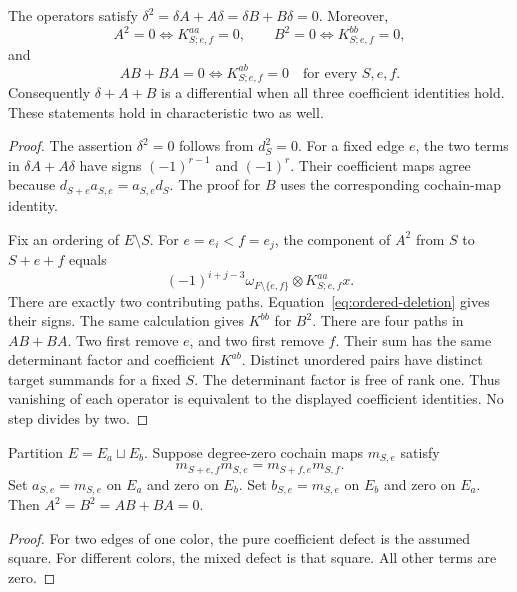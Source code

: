 \begin{theorem}
\label{thm:exact-coefficient-criterion}
The operators satisfy $\delta^2=\delta A+A\delta=\delta B+B\delta=0$.
Moreover,
\[
A^2=0\iff K^{aa}_{S;e,f}=0,\qquad
B^2=0\iff K^{bb}_{S;e,f}=0,
\]
and
\begin{equation}
\label{eq:exact-mixed-criterion}
AB+BA=0\iff K^{ab}_{S;e,f}=0
\quad\text{for every }S,e,f.
\end{equation}
Consequently $\delta+A+B$ is a differential when all three coefficient identities hold.
These statements hold in characteristic two as well.
\end{theorem}

\begin{proof}
The assertion $\delta^2=0$ follows from $d_S^2=0$.
For a fixed edge $e$, the two terms in $\delta A+A\delta$ have signs
$(-1)^{r-1}$ and $(-1)^r$.
Their coefficient maps agree because $d_{S+e}a_{S,e}=a_{S,e}d_S$.
The proof for $B$ uses the corresponding cochain-map identity.

Fix an ordering of $E\setminus S$.
For $e=e_i<f=e_j$, the component of $A^2$ from $S$ to $S+e+f$ equals
\[
(-1)^{i+j-3}\omega_{F\setminus\{e,f\}}
 \otimes K^{aa}_{S;e,f}x.
\]
There are exactly two contributing paths.
Equation~\eqref{eq:ordered-deletion} gives their signs.
The same calculation gives $K^{bb}$ for $B^2$.
There are four paths in $AB+BA$.
Two first remove $e$, and two first remove $f$.
Their sum has the same determinant factor and coefficient $K^{ab}$.
Distinct unordered pairs have distinct target summands for a fixed $S$.
The determinant factor is free of rank one.
Thus vanishing of each operator is equivalent to the displayed coefficient identities.
No step divides by two.
\end{proof}

\begin{corollary}
\label{cor:colored-edges}
Partition $E=E_a\sqcup E_b$.
Suppose degree-zero cochain maps $m_{S,e}$ satisfy
\[
m_{S+e,f}m_{S,e}=m_{S+f,e}m_{S,f}.
\]
Set $a_{S,e}=m_{S,e}$ on $E_a$ and zero on $E_b$.
Set $b_{S,e}=m_{S,e}$ on $E_b$ and zero on $E_a$.
Then $A^2=B^2=AB+BA=0$.
\end{corollary}

\begin{proof}
For two edges of one color, the pure coefficient defect is the assumed square.
For different colors, the mixed defect is that square.
All other terms are zero.
\end{proof}

